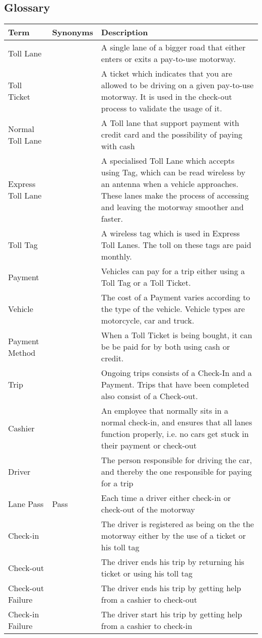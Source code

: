 \subsection{Glossary}
\madeby{\mb}{\af}

\begin{table}[H]
\centering
\begin{tabular}{| p{} | p{} | p{} |}
\hline
\textbf{Term}  &  \textbf{Synonyms}  & \textbf{Description} \\ \hline

 Toll Lane &    & A single lane of a bigger road that either enters or exits a pay-to-use motorway. \\ \hline
 Toll Ticket &    &  A ticket which indicates that you are allowed to be driving on a given pay-to-use motorway. It is used in the check-out process to validate the usage of it.\\ \hline
 Normal Toll Lane  &    &  A Toll lane that support payment with credit card and the possibility of paying with cash     \\ \hline
 Express Toll Lane &    &  A specialised Toll Lane which accepts using Tag, which can be read wireless by an antenna when a vehicle approaches. These lanes make the process of accessing and leaving the motorway smoother and faster.\\ \hline
Toll Tag  &    &  A wireless tag which is used in Express Toll Lanes. The toll on these tags are paid monthly.\\ \hline
Payment  &    & Vehicles can pay for a trip either using a Toll Tag or a Toll Ticket. \\ \hline
Vehicle  &    & The cost of a Payment varies according to the type of the vehicle. Vehicle types are motorcycle, car and truck. \\ \hline
Payment Method  &    &  When a Toll Ticket is being bought, it can be be paid for by both using cash or credit.\\ \hline
Trip  &    & Ongoing trips consists of a Check-In and a Payment. Trips that have been completed also consist of a Check-out. \\ \hline
Cashier  &    & An employee that normally sits in a normal check-in, and ensures that all lanes function properly, i.e. no cars get stuck in their payment or check-out  \\ \hline
Driver  &    & The person responsible for driving the car, and thereby the one responsible for paying for a trip \\ \hline
Lane Pass  & Pass & Each time a driver either check-in or check-out of the motorway \\ \hline
Check-in   &  & The driver is registered as being on the the motorway either by the use of a ticket or his toll tag  \\ \hline
Check-out  &  & The driver ends his trip by returning his ticket or using his toll tag \\ \hline
Check-out Failure & & The driver ends his trip by getting help from a cashier to check-out \\ \hline 
Check-in Failure & & The driver start his trip by getting help from a cashier to check-in \\ \hline


\end{tabular}
\end{table}
